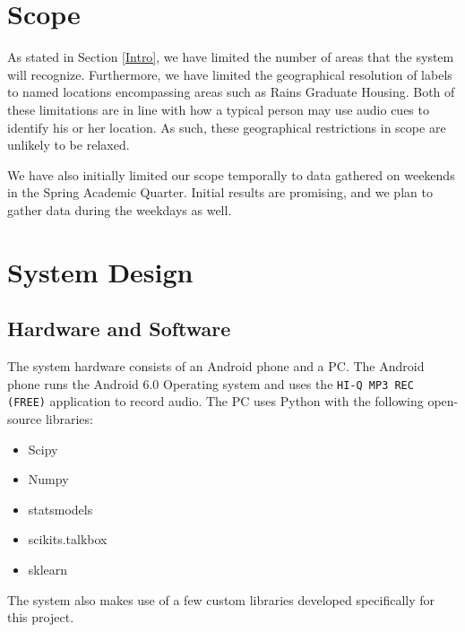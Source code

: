 \documentclass[journal]{IEEEtran}
\begin{document}
\section{Scope}
As stated in Section \ref{Intro}, we have limited the number of areas that the system will recognize. Furthermore, we have limited the geographical resolution of labels to named locations encompassing areas such as Rains Graduate Housing. Both of these limitations are in line with how a typical person may use audio cues to identify his or her location. As such, these geographical restrictions in scope are unlikely to be relaxed.

We have also initially limited our scope temporally to data gathered on weekends in the Spring Academic Quarter. Initial results are promising, and we plan to gather data during the weekdays as well.

\section{System Design}\label{SystemDesign}
\subsection{Hardware and Software}\label{HwSw}
The system hardware consists of an Android phone and a PC. The Android phone runs the Android 6.0 Operating system and uses the \texttt{HI-Q MP3 REC (FREE)} application to record audio. The PC uses Python with the following open-source libraries:
\begin{itemize}
\item Scipy
\item Numpy
\item statsmodels
\item scikits.talkbox
\item sklearn
\end{itemize}
The system also makes use of a few custom libraries developed specifically for this project.
\end{document}

